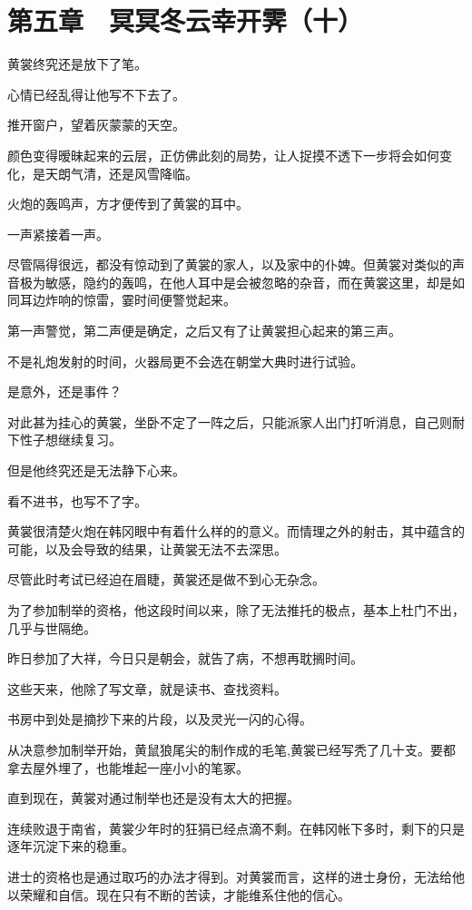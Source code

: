 \section{第五章　冥冥冬云幸开霁（十）}

黄裳终究还是放下了笔。

心情已经乱得让他写不下去了。

推开窗户，望着灰蒙蒙的天空。

颜色变得暧昧起来的云层，正仿佛此刻的局势，让人捉摸不透下一步将会如何变化，是天朗气清，还是风雪降临。

火炮的轰鸣声，方才便传到了黄裳的耳中。

一声紧接着一声。

尽管隔得很远，都没有惊动到了黄裳的家人，以及家中的仆婢。但黄裳对类似的声音极为敏感，隐约的轰鸣，在他人耳中是会被忽略的杂音，而在黄裳这里，却是如同耳边炸响的惊雷，霎时间便警觉起来。

第一声警觉，第二声便是确定，之后又有了让黄裳担心起来的第三声。

不是礼炮发射的时间，火器局更不会选在朝堂大典时进行试验。

是意外，还是事件？

对此甚为挂心的黄裳，坐卧不定了一阵之后，只能派家人出门打听消息，自己则耐下性子想继续复习。

但是他终究还是无法静下心来。

看不进书，也写不了字。

黄裳很清楚火炮在韩冈眼中有着什么样的的意义。而情理之外的射击，其中蕴含的可能，以及会导致的结果，让黄裳无法不去深思。

尽管此时考试已经迫在眉睫，黄裳还是做不到心无杂念。

为了参加制举的资格，他这段时间以来，除了无法推托的极点，基本上杜门不出，几乎与世隔绝。

昨日参加了大祥，今日只是朝会，就告了病，不想再耽搁时间。

这些天来，他除了写文章，就是读书、查找资料。

书房中到处是摘抄下来的片段，以及灵光一闪的心得。

从决意参加制举开始，黄鼠狼尾尖的制作成的毛笔,黄裳已经写秃了几十支。要都拿去屋外埋了，也能堆起一座小小的笔冢。

直到现在，黄裳对通过制举也还是没有太大的把握。

连续败退于南省，黄裳少年时的狂狷已经点滴不剩。在韩冈帐下多时，剩下的只是逐年沉淀下来的稳重。

进士的资格也是通过取巧的办法才得到。对黄裳而言，这样的进士身份，无法给他以荣耀和自信。现在只有不断的苦读，才能维系住他的信心。

